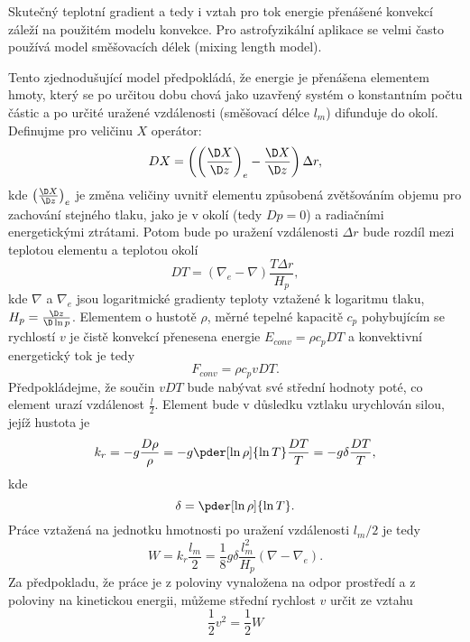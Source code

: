 Skutečný teplotní gradient a tedy i vztah pro tok energie přenášené konvekcí záleží na použitém modelu konvekce. Pro astrofyzikální aplikace se velmi často používá model směšovacích délek (mixing length model).

Tento zjednodušující model předpokládá, že energie je přenášena elementem hmoty, který se po určitou dobu chová jako uzavřený systém o konstantním počtu částic a po určité uražené vzdálenosti (směšovací délce $l_m$) difunduje do okolí. Definujme pro veličinu $X$ operátor:
\begin{equation}
	DX = \left(\left(\frac{\D X}{\D z}\right)_e-\frac{\D X}{\D z}\right)\Delta r,
\end{equation}
kde $\left(\frac{\D X}{\D z}\right)_e$ je změna veličiny uvnitř elementu způsobená zvětšováním objemu pro zachování stejného tlaku, jako je v okolí (tedy $Dp=0$) a radiačními energetickými ztrátami. Potom bude po uražení vzdálenosti $\Delta r$ bude rozdíl mezi teplotou elementu a teplotou okolí
\begin{equation}
	D T = \left(\nabla_e-\nabla\right)\frac{T\Delta r}{H_p}, \label{eq:nne}
\end{equation}
kde $\nabla$ a $\nabla_e$ jsou logaritmické gradienty teploty vztažené k logaritmu tlaku, $H_p=\frac{\D z}{\D\ln p}$. Elementem o hustotě $\rho$, měrné tepelné kapacitě $c_p$ pohybujícím se rychlostí $v$ je čistě konvekcí přenesena energie $E_{conv}=\rho c_p D T$ a konvektivní energetický tok je tedy
\begin{equation}
	F_{conv} = \rho c_p v D T.
\end{equation}
Předpokládejme, že součin $vDT$ bude nabývat své střední hodnoty poté, co element urazí vzdálenost $\frac{l}{2}$. Element bude v důsledku vztlaku urychlován silou, jejíž hustota je
\begin{equation}
	k_r=-g \frac{D\rho}{\rho}=-g\pder[\ln\rho]{\ln T}\frac{DT}{T}=-g\delta\frac{DT}{T},
\end{equation}
kde
\begin{equation}
	\delta=\pder[\ln\rho]{\ln T}.
\end{equation}
Práce vztažená na jednotku hmotnosti po uražení vzdálenosti $l_m/2$ je tedy
\begin{equation}
	W = k_r\frac{l_m}{2}=\frac{1}{8}g\delta\frac{l_m^2}{H_p}(\nabla-\nabla_e).
\end{equation}
Za předpokladu, že práce je z poloviny vynaložena na odpor prostředí a z poloviny na kinetickou energii, můžeme střední rychlost $v$ určit ze vztahu
\begin{equation}
	\frac{1}{2}v^2=\frac{1}{2}W
\end{equation}
